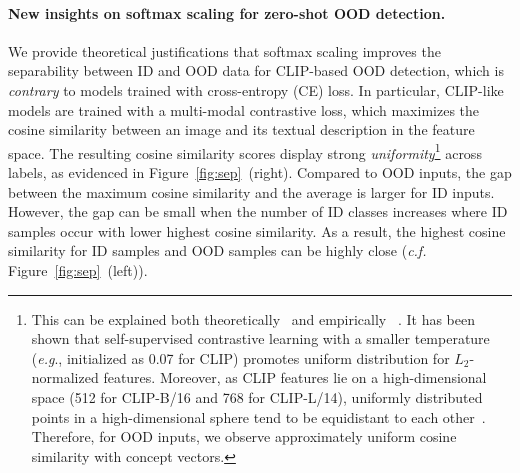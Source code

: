 \documentclass{article}
\def\eg{\emph{e.g}., }
\begin{document}
\paragraph{New insights on softmax scaling for zero-shot OOD detection.} 
We provide theoretical justifications that softmax scaling improves the separability between ID and OOD data for CLIP-based OOD detection, which is \emph{contrary} to models trained with cross-entropy (CE) loss.
In particular, CLIP-like models are trained with a multi-modal contrastive loss, which maximizes the cosine similarity between an image and its textual description in the feature space. The resulting cosine similarity scores display strong \emph{uniformity}\footnote{\noindent This can be explained both theoretically~\cite{wang2020understanding} and empirically ~\cite{wang2021understanding}. It has been shown that self-supervised contrastive learning with a smaller temperature (\eg initialized as 0.07 for CLIP) promotes uniform distribution for $L_2$-normalized features. Moreover, as CLIP features lie on a high-dimensional space (512 for CLIP-B/16 and 768 for CLIP-L/14), uniformly distributed points in a high-dimensional sphere tend to be equidistant to each other~\cite{vershynin2018high}. Therefore, for OOD inputs, we observe approximately uniform cosine similarity with concept vectors.} across labels, as evidenced in Figure~\ref{fig:sep}~(right). Compared to OOD inputs, the {gap} between the maximum cosine similarity and the average is larger for ID inputs. However, the gap can be small when the number of ID classes increases where ID samples occur with lower highest cosine similarity. As a result,  the highest cosine similarity for ID samples and OOD samples can be highly close (\emph{c.f.} Figure~\ref{fig:sep}~(left)). 
\end{document}
